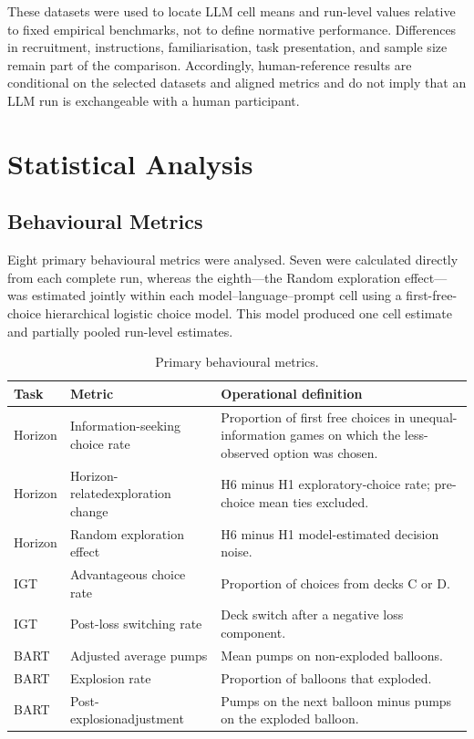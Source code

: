 \documentclass[logo,msc,inf]{infthesis}       %
\begin{document}
These datasets were used to locate LLM cell means and run-level values relative to fixed empirical benchmarks, not to define normative performance. Differences in recruitment, instructions, familiarisation, task presentation, and sample size remain part of the comparison. Accordingly, human-reference results are conditional on the selected datasets and aligned metrics and do not imply that an LLM run is exchangeable with a human participant.

\section{Statistical Analysis}

\subsection{Behavioural Metrics}

Eight primary behavioural metrics were analysed. Seven were calculated directly
from each complete run, whereas the eighth---the Random exploration effect---was
estimated jointly within each model--language--prompt cell using a first-free-choice
hierarchical logistic choice model. This model produced one cell estimate and
partially pooled run-level estimates.

\begin{table}[htbp]
\centering
\caption{Primary behavioural metrics.}
\label{tab:behavioural_metrics}
\begin{tabularx}{\textwidth}{@{}p{1.7cm}p{3.8cm}X@{}}
\toprule
\textbf{Task} & \textbf{Metric} & \textbf{Operational definition} \\
\midrule
Horizon & Information-seeking choice rate & Proportion of first free choices in unequal-information games on which the less-observed option was chosen. \\
Horizon & Horizon-related\newline exploration change & H6 minus H1 exploratory-choice rate; pre-choice mean ties excluded. \\
Horizon & Random exploration effect & H6 minus H1 model-estimated decision noise. \\
IGT & Advantageous choice rate & Proportion of choices from decks C or D. \\
IGT & Post-loss switching rate & Deck switch after a negative loss component. \\
BART & Adjusted average pumps & Mean pumps on non-exploded balloons. \\
BART & Explosion rate & Proportion of balloons that exploded. \\
BART & Post-explosion\newline adjustment & Pumps on the next balloon minus pumps on the exploded balloon. \\
\bottomrule
\end{tabularx}
\end{table}
\end{document}
